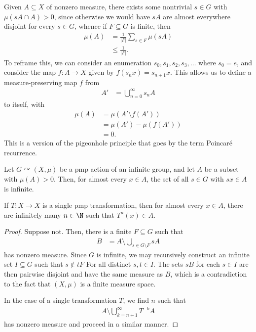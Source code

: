 \documentclass[10pt]{mypackage}
\begin{document}
Given $A\subseteq X$ of nonzero measure, there exists some nontrivial $s\in G$ with $\mu\left( sA\cap A \right) > 0$, since otherwise we would have $ sA $ are almost everywhere disjoint for every $s\in G$, whence if $F\subseteq G$ is finite, then 
\begin{align*}
  \mu\left( A \right) &= \frac{1}{\left\vert F \right\vert}\sum_{s\in F} \mu\left( sA \right)\\
                      &\leq \frac{1}{\left\vert F \right\vert}.
\end{align*}
To reframe this, we can consider an enumeration $s_0,s_1,s_2,s_3,\dots$ where $s_0 = e$, and consider the map $f\colon A\rightarrow X$ given by $f\left( s_n x \right) = s_{n+1}x$. This allows us to define a measure-preserving map $f$ from
\begin{align*}
  A' &= \bigcup_{n=0}^{\infty}s_nA
\end{align*}
to itself, with
\begin{align*}
  \mu\left( A \right) &= \mu\left( A'\setminus f\left( A' \right) \right)\\
                      &= \mu\left( A' \right)-\mu\left( f\left( A' \right)\right)\\
                      &= 0.
\end{align*}
This is a version of the pigeonhole principle that goes by the term Poincaré recurrence.
\begin{theorem}
  Let $G\curvearrowright \left( X,\mu \right)$ be a pmp action of an infinite group, and let $A$ be a subset with $\mu\left( A  \right)> 0$. Then, for almost every $x\in A$, the set of all $s\in G$ with $sx \in A$ is infinite.

  If $T\colon X\rightarrow X$ is a single pmp transformation, then for almost every $x\in A$, there are infinitely many $n\in \N$ such that $T^n(x) \in A$.
\end{theorem}
\begin{proof}
  Suppose not. Then, there is a finite $F\subseteq G$ such that
  \begin{align*}
    B &= A\setminus \bigcup_{s\in G\setminus F} sA
  \end{align*}
  has nonzero measure. Since $G$ is infinite, we may recursively construct an infinite set $I\subseteq G$ such that $s\notin tF$ For all distinct $s,t\in I$. The sets $sB$ for each $s\in I$ are then pairwise disjoint and have the same measure as $B$, which is a contradiction to the fact that $\left( X,\mu \right)$ is a finite measure space.

  In the case of a single transformation $T$, we find $n$ such that
  \begin{align*}
    A\setminus \bigcup_{k=n+1}^{\infty}T^{-k}A
  \end{align*}
  has nonzero measure and proceed in a similar manner.
\end{proof}
\end{document}
